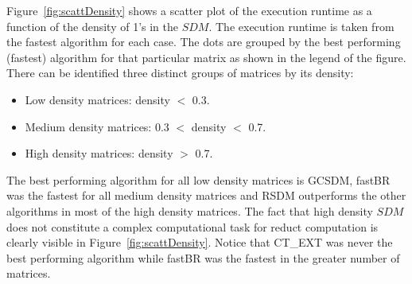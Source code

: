 \documentclass[authoryear,11pt]{elsarticle}
\begin{document}
	Figure~\ref{fig:scattDensity} shows a scatter plot of the execution runtime as a function of 
	the density of 1's in the $SDM$. The execution runtime is taken from the fastest algorithm for 
	each case. The dots are grouped by the best performing (fastest)	algorithm for that particular 
	matrix as shown in the legend of the figure. There can be identified three distinct groups of 
	matrices by its density:
	\begin{itemize}
	\item Low density matrices: density $<$ 0.3.
	\item Medium density matrices: 0.3 $<$ density $<$ 0.7.
	\item High density matrices: density $>$ 0.7.
	\end{itemize}
	The best performing algorithm for all low density matrices is GCSDM, fastBR was the fastest for
	all medium density matrices and RSDM outperforms the other algorithms in most of the high
	density matrices. The fact that high density $SDM$ does not constitute a complex computational
	task for reduct computation is clearly visible in Figure~\ref{fig:scattDensity}. Notice that
	CT\_EXT was never the best performing algorithm while fastBR was the fastest in the greater number
	of matrices.
		
\end{document}
